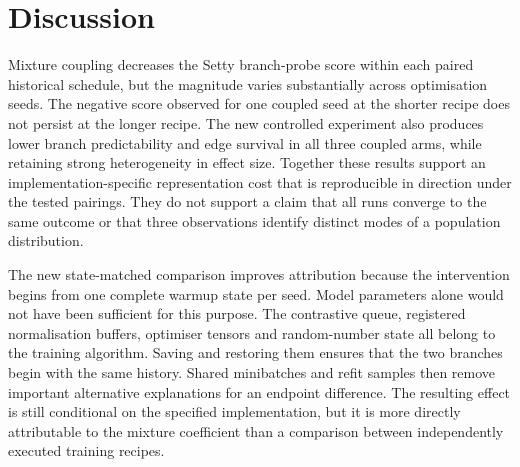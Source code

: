 \documentclass[11pt]{article}
\begin{document}
\section{Discussion}
Mixture coupling decreases the Setty branch-probe score within each paired historical schedule, but the magnitude varies substantially across optimisation seeds. The negative score observed for one coupled seed at the shorter recipe does not persist at the longer recipe. The new controlled experiment also produces lower branch predictability and edge survival in all three coupled arms, while retaining strong heterogeneity in effect size. Together these results support an implementation-specific representation cost that is reproducible in direction under the tested pairings. They do not support a claim that all runs converge to the same outcome or that three observations identify distinct modes of a population distribution.

The new state-matched comparison improves attribution because the intervention begins from one complete warmup state per seed. Model parameters alone would not have been sufficient for this purpose. The contrastive queue, registered normalisation buffers, optimiser tensors and random-number state all belong to the training algorithm. Saving and restoring them ensures that the two branches begin with the same history. Shared minibatches and refit samples then remove important alternative explanations for an endpoint difference. The resulting effect is still conditional on the specified implementation, but it is more directly attributable to the mixture coefficient than a comparison between independently executed training recipes.
\end{document}
